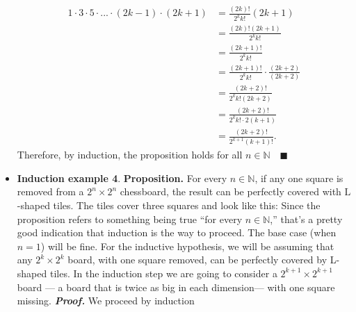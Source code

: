 \documentclass{report}
\begin{document}
\begin{itemize}
\begin{align*}
                1 \cdot 3 \cdot 5 \cdot ... \cdot (2k-1) \cdot (2k+1) &= \frac{(2k)!}{2^{k}k!}(2k+1) \\
                                                                      &= \frac{(2k)!(2k+1)}{2^{k}k!} \\
                                                                      &= \frac{(2k+1)!}{2^{k}k!} \\
                                                                      &=\frac{(2k+1)!}{2^{k}k!} \cdot \frac{(2k+2)}{(2k+2)} \\
                                                                      &= \frac{(2k+2)!}{2^{k}k!(2k+2)} \\
                                                                      &= \frac{(2k+2)!}{2^{k}k! \cdot 2(k+1)} \\
                                                                      &= \frac{(2k+2)!}{2^{k+1}(k+1)!}
            .\end{align*}
            Therefore, by induction, the proposition holds for all $n\in \mathbb{N} \quad \blacksquare$
        \item \textbf{Induction example 4}. 
            \bigbreak \noindent 
            \textbf{Proposition.} For every $n \in \mathbb{N}$, if any one square is removed from a $2^n \times 2^n$ chessboard, the result can be perfectly covered with $\text{L}$-shaped tiles.
            \bigbreak \noindent 
            The tiles cover three squares and look like this:
            \bigbreak \noindent 
            \bigbreak \noindent 
            Since the proposition refers to something being true “for every \( n \in \mathbb{N} \),” that’s a pretty good indication that induction is the way to proceed. The base case (when \( n = 1 \)) will be fine. For the inductive hypothesis, we will be assuming that any \( 2^k \times 2^k \) board, with one square removed, can be perfectly covered by L-shaped tiles.
            \bigbreak \noindent 
            In the induction step we are going to consider a $2^{k+1} \times 2^{k+1}$ board — a board that is twice as big in each dimension— with one square missing.
            \pagebreak \bigbreak \noindent 
            \textbf{\textit{Proof.}} We proceed by induction
            \bigbreak \noindent 
\end{itemize}
\end{document}
